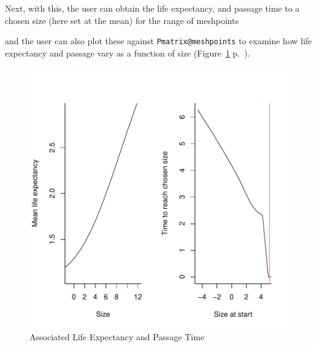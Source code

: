 \documentclass{article}
\begin{document}
Next, with this, the user can obtain the life expectancy, and passage time to a chosen size (here set at the mean) for the range of meshpoints
\begin{Schunk}
\end{Schunk}
and the user can also plot these against {\tt Pmatrix@meshpoints} to examine how
life expectancy and passage vary as a function of size (Figure~\ref{fig:three} p.~\pageref{fig:three}).
\begin{figure}
\begin{center}
\includegraphics{IPMpack_vignette-fig3}
\end{center}
\caption{Associated Life Expectancy and Passage Time}
\label{fig:three}
\end{figure}
\end{document}
